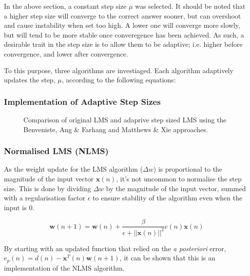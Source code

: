 \documentclass[main.tex]{subfiles}
\begin{document}
In the above section, a constant step size $\mu$ was selected. It should be noted that a higher step size will converge to the correct answer sooner, but can overshoot and cause instability when set too high. A lower one will converge more slowly, but will tend to be more stable once converegence has been achieved. As such, a desirable trait in the step size is to allow them to be adaptive; i.e. higher before convergence, and lower after convergence. 

To this purpose, three algorithms are investiaged. Each algorithm adaptively updates the step, $\mu$, according to the following equations:



	
\subsubsection{Implementation of Adaptive Step Sizes}

\begin{figure}[h]
	\centering 
	\resizebox{\textwidth}{!}{}
	\caption{Comparison of original LMS and adaprive step sized LMS using the Benveniste, Ang \& Farhang and Matthews \& Xie approaches.}
	\label{fig:q3_2_a}
\end{figure}





\subsubsection{Normalised LMS (NLMS)}

As the weight update for the LMS algorithm ($\Delta w$) is proportional to the magnitude of the input vector $\textbf{x}(n)$, it's not uncommon to normalise the step size. This is done by dividing $\Delta w$ by the magnitude of the input vector, summed with a regularisation factor $\epsilon$ to ensure stability of the algorithm even when the input is 0.

\begin{equation*}
\textbf{w}(n+1) = \textbf{w}(n) + \frac{\beta}{\epsilon + ||\textbf{x}(n)||^2}e(n)\textbf{x}(n)
\end{equation*}

By starting with an updated function that relied on the \textit{a posteriori} error, $e_p(n) = d(n) - \textbf{x}^T(n)\textbf{w}(n+1)$, it can be shown that this is an implementation of the NLMS algorithm.
\end{document}
